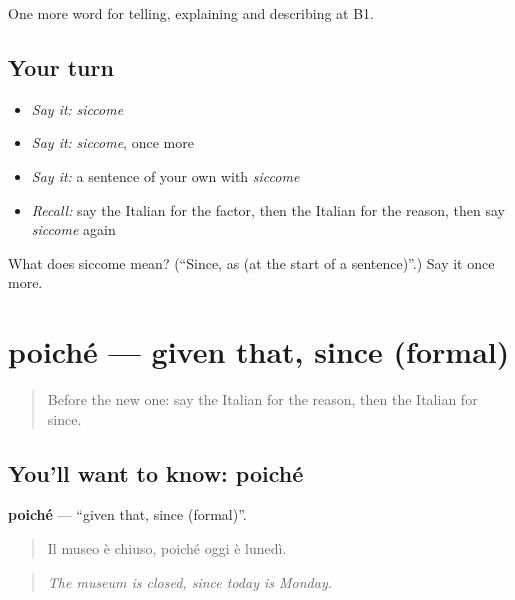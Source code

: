 \begin{grammarlens}[title={What you've built}]
One more word for telling, explaining and describing at B1.
\end{grammarlens}

\subsection*{Your turn}
\begin{itemize}
\raggedright
  \item \emph{Say it:} \emph{siccome}
  \item \emph{Say it:} \emph{siccome}, once more
  \item \emph{Say it:} a sentence of your own with \emph{siccome}
  \item \emph{Recall:} say the Italian for the factor, then the Italian for the reason, then say \emph{siccome} again
\end{itemize}

\begin{tcolorbox}[breakable,colback=teal!4,colframe=teal!35!black,title={Before you move on}]
What does siccome mean? (\textquotedblleft{}Since, as (at the start of a sentence)\textquotedblright{}.) Say it once more.
\end{tcolorbox}
\section[poiché]{poiché — given that, since (formal)}

\label{lesson:IT-C350-poiche}



\begin{quote}
Before the new one: say the Italian for the reason, then the Italian for since.
\end{quote}

\subsection*{You'll want to know: poiché}
\textbf{poiché} — \textquotedblleft{}given that, since (formal)\textquotedblright{}.

\begin{quote}
Il museo è chiuso, poiché oggi è lunedì.
\end{quote}

\begin{quote}
\emph{The museum is closed, since today is Monday.}
\end{quote}

